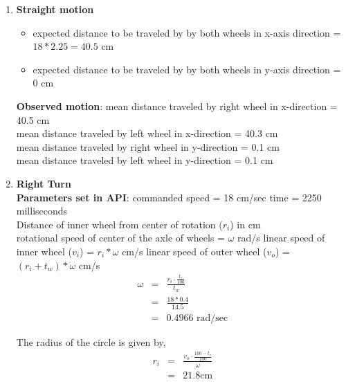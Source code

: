 \begin{enumerate}
\item \textbf{Straight motion}
\begin{itemize}
\item expected distance to be traveled by by both wheels in x-axis direction = $ 18 * 2.25 = 40.5$ cm
\item expected distance to be traveled by by both wheels in y-axis direction = $0$ cm
\end{itemize}

\textbf{Observed motion}:
mean distance traveled by right wheel in x-direction = 40.5 cm\\
mean distance traveled by left wheel in x-direction = 40.3 cm \\
mean distance traveled by right wheel in y-direction = 0.1 cm \\
mean distance traveled by left wheel in y-direction = 0.1 cm 

	\item \textbf{Right Turn} \\
	\textbf{Parameters set in API}: \newline
	commanded speed = 18 cm/sec \newline
	time = 2250 milliseconds \newline
	\\
	
	Distance of inner wheel from center of rotation ($r_i$) in cm \\ 
	rotational speed of center of the axle of wheels = $\omega$ rad/s \newline
	linear speed of inner wheel ($v_i$) = $r_i * \omega$ cm/s \newline
	linear speed of outer wheel ($v_o$) = $(r_i + t_w ) * \omega$ cm/s \newline
\begin{equation}
\begin{array}{rcl}
\omega &=& \frac{r_i \cdot \frac{t_r}{100}}{t_w} \\
 &=& \frac{18 * 0.4}{14.5} \\
 &=& 0.4966 \text{ rad/sec}
\end{array}
\end{equation}

The radius of the circle is given by,
\begin{equation}
\begin{array}{rcl}
r_i &=& \frac{v_o \cdot \frac{100 - t_r}{100}}{\omega} \\
&=& 21.8 \text{cm}
\end{array}
\end{equation}


\end{enumerate}
